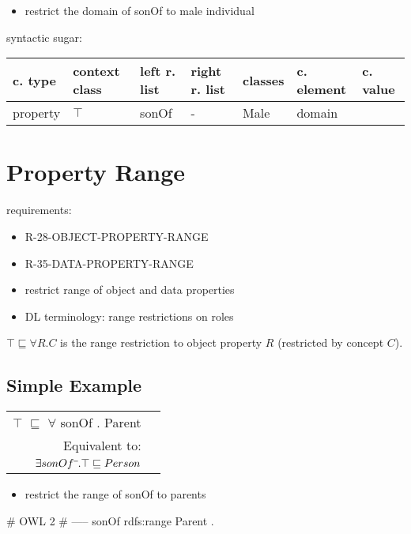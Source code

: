 \documentclass{llncs}
\newenvironment{gcotable}{
  \scriptsize
  \sffamily
  \vspace{0.3cm}
	\begin{center}
  \begin{tabular}{l|l|l|l|l|l|l}
  \hline
  \textbf{c. type} & \textbf{context class} & \textbf{left r. list} & \textbf{right r. list} & \textbf{classes} & \textbf{c. element} & \textbf{c. value} \\
  \hline

}{
  \hline
  \end{tabular}
	\end{center}
}
\newenvironment{DL}{
	\begin{center}
  \begin{tabular}{r l}

}{
  \end{tabular}
	\end{center}
}
\begin{document}
\begin{itemize}
	\item restrict the domain of sonOf to male individual
\end{itemize}

syntactic sugar:

\begin{gcotable}
property & $\top$ & sonOf & - & Male & domain \\
\end{gcotable}

\section{Property Range}

requirements:

\begin{itemize}
	\item R-28-OBJECT-PROPERTY-RANGE
	\item R-35-DATA-PROPERTY-RANGE
\end{itemize}

\begin{itemize}
	\item restrict range of object and data properties
	\item DL terminology: range restrictions on roles
\end{itemize}

$\top \sqsubseteq \forall R . C$ is the range restriction to object property $R$ (restricted by concept $C$).  

\subsection{Simple Example}

\begin{DL}
$\top$ $\sqsubseteq$ $\forall$ sonOf . Parent \\
Equivalent to:\\
$\exists sonOf\sp{\overline{\ }}.\top \sqsubseteq Person$
\end{DL}

\begin{itemize}
	\item restrict the range of sonOf to parents
\end{itemize}

\begin{ex}
# OWL 2
# -----
sonOf rdfs:range Parent . 
\end{ex}
\end{document}
